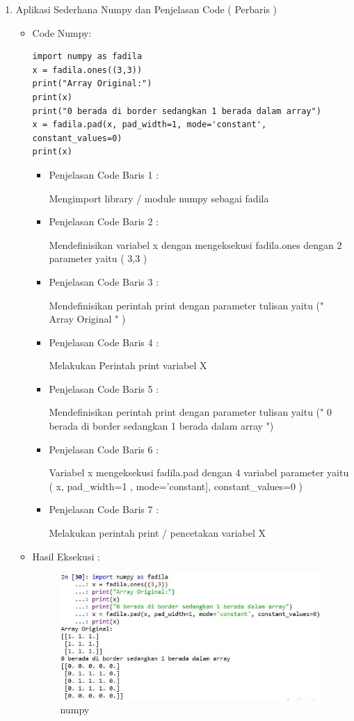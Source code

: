 \begin{enumerate}
\par
\par
\item Aplikasi Sederhana Numpy dan Penjelasan Code ( Perbaris )
\begin{itemize}
\item Code Numpy:
\begin{lstlisting}
import numpy as fadila
x = fadila.ones((3,3))
print("Array Original:")
print(x)
print("0 berada di border sedangkan 1 berada dalam array")
x = fadila.pad(x, pad_width=1, mode='constant', constant_values=0)
print(x)
\end{lstlisting}
\par
\begin{itemize}
\item Penjelasan Code Baris 1 :
\par Mengimport library / module numpy sebagai fadila
\item Penjelasan Code Baris 2 :
\par Mendefinisikan variabel x dengan mengeksekusi fadila.ones dengan 2 parameter yaitu ( 3,3 )
\item Penjelasan Code Baris 3 :
\par Mendefinisikan perintah print dengan parameter tulisan yaitu (" Array Original " )
\item Penjelasan Code Baris 4 :
\par Melakukan Perintah print variabel X
\item Penjelasan Code Baris 5 :
\par Mendefinisikan perintah print dengan parameter tulisan yaitu (" 0 berada di border sedangkan 1 berada dalam array ")
\item Penjelasan Code Baris 6 :
\par Variabel x mengeksekusi fadila.pad dengan 4 variabel parameter yaitu ( x, pad\_width=1 , mode='constant], constant\_values=0 )
\item Penjelasan Code Baris 7 :
\par  Melakukan perintah print / pencetakan variabel X
\end{itemize}
\item Hasil Eksekusi :
\par
\par
\begin{figure}[ht]
\centering
\includegraphics[scale=0.4]{figures/numpyfadila.jpg}
\caption{numpy}
\label{contoh}
\end{figure}
\par
\par
\end{itemize}


\end{enumerate}
